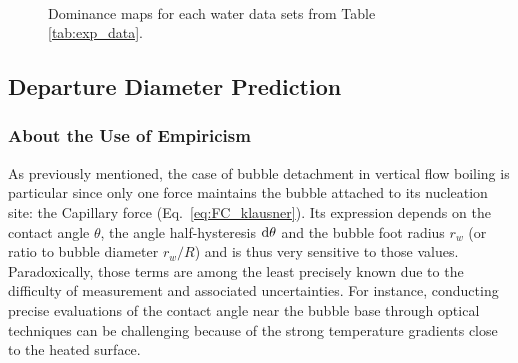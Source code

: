 \begin{figure}[h!]
\begin{center}
{\label{fig:exp_chen}
}
\\


	\caption{Dominance maps for each water data sets from Table \ref{tab:exp_data}.}	
	\label{fig:exp_maps}
\end{center}
\end{figure}



\subsection{Departure Diameter Prediction}\label{subsec:Dd_pred}

\subsubsection{About the Use of Empiricism}
 
As previously mentioned, the case of bubble detachment in vertical flow boiling is particular since only one force maintains the bubble attached to its nucleation site: the Capillary force (Eq.~\ref{eq:FC_klausner}). Its expression depends on the contact angle $\theta$, the angle half-hysteresis $\mathrm{d}\theta$ and the bubble foot radius $r_{w}$ (or ratio to bubble diameter $r_{w}/R$) and is thus very sensitive to those values. Paradoxically, those terms are among the least precisely known due to the difficulty of measurement and associated uncertainties. For instance, conducting precise evaluations of the contact angle near the bubble base through optical techniques can be challenging because of the strong temperature gradients close to the heated surface. 


